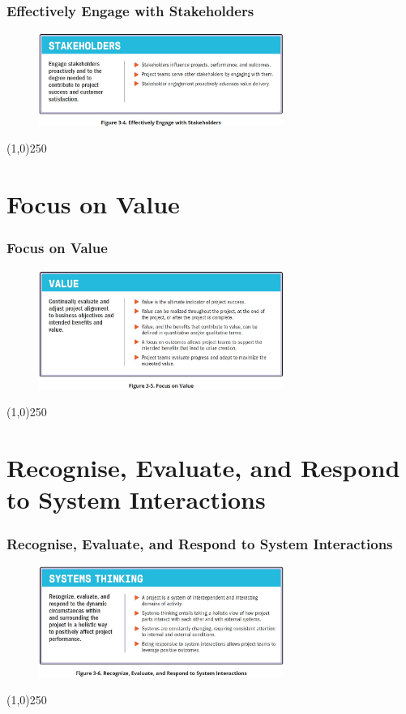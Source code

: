 \begin{frame}
\frametitle{Effectively Engage with Stakeholders}
 \begin{figure}
    \centering
        \includegraphics[width = 8cm]{../images/standard/Fig3-4.jpg}
    \label{standardfig:3-4}
 \end{figure}
\end{frame}
\begin{center}\line(1,0){250}\end{center}



\section{Focus on Value}


\begin{frame}
\frametitle{Focus on Value}
 \begin{figure}
    \centering
        \includegraphics[width = 8cm]{../images/standard/Fig3-5.jpg}
    \label{standardfig:3-5}
 \end{figure}
\end{frame}
\begin{center}\line(1,0){250}\end{center}



\section{Recognise, Evaluate, and Respond to System Interactions}

\begin{frame}
\frametitle{Recognise, Evaluate, and Respond to System Interactions}
 \begin{figure}
    \centering
        \includegraphics[width = 8cm]{../images/standard/Fig3-6.jpg}
    \label{standardfig:3-6}
 \end{figure}
\end{frame}
\begin{center}\line(1,0){250}\end{center}



